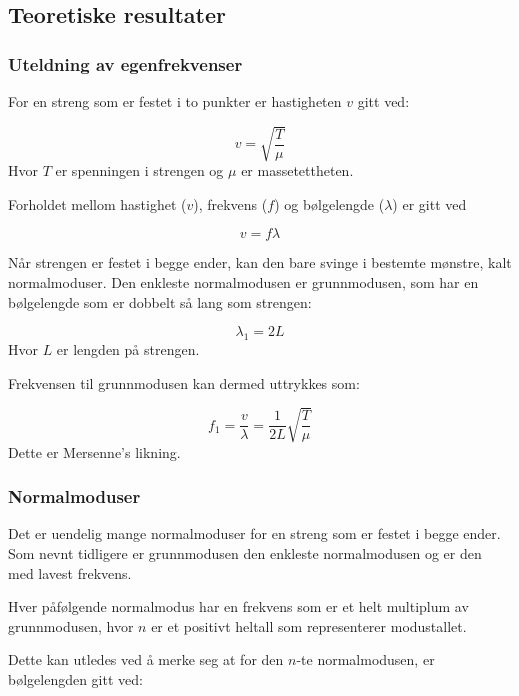 \subsection{Teoretiske resultater}
\subsubsection{Uteldning av egenfrekvenser}
For en streng som er festet i to punkter er hastigheten $v$ gitt ved:

\begin{equation*}
    v = \sqrt{\frac{T}{\mu}}
\end{equation*}
Hvor $T$ er spenningen i strengen og $\mu$ er massetettheten. 

Forholdet mellom hastighet ($v$), frekvens ($f$) og bølgelengde ($\lambda$) er gitt ved

\begin{equation*}
    v = f \lambda
\end{equation*}  

Når strengen er festet i begge ender, kan den bare svinge i bestemte mønstre, kalt normalmoduser.
Den enkleste normalmodusen er grunnmodusen, som har en bølgelengde som er dobbelt så lang som strengen:

\begin{equation*}
    \lambda_1 = 2L
\end{equation*}
Hvor $L$ er lengden på strengen.

Frekvensen til grunnmodusen kan dermed uttrykkes som:

\begin{equation*}
    f_1 = \frac{v}{\lambda} = \frac{1}{2L} \sqrt{\frac{T}{\mu}}
\end{equation*}
Dette er Mersenne's likning.




\subsubsection{Normalmoduser}

Det er uendelig mange normalmoduser for en streng som er festet i begge ender.
Som nevnt tidligere er grunnmodusen den enkleste normalmodusen og er den med lavest frekvens.

Hver påfølgende normalmodus har en frekvens som er et helt multiplum av grunnmodusen,
hvor $n$ er et positivt heltall som representerer modustallet.

Dette kan utledes ved å merke seg at for den $n$-te normalmodusen, er bølgelengden gitt ved:

